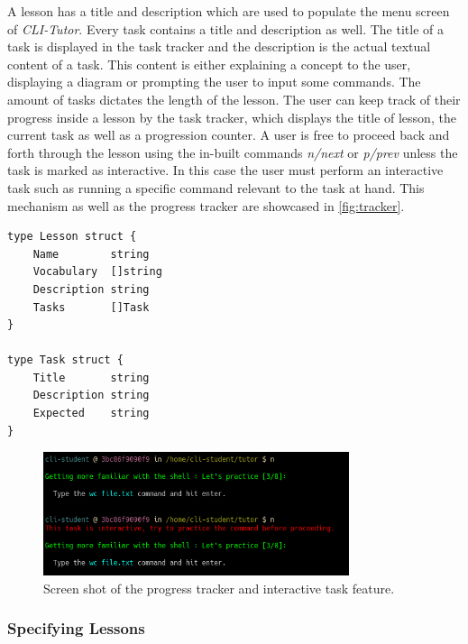 A lesson has a title and description which are used to populate the menu screen
of \textit{CLI-Tutor}. Every task contains a title and description as well. The
title of a task is displayed in the task tracker and the description is the
actual textual content of a task. This content is either explaining a concept
to the user, displaying a diagram or prompting the user to input some commands.
The amount of tasks dictates the length of the lesson. The user can keep track
of their progress inside a lesson by the task tracker, which displays the title
of lesson, the current task as well as a progression counter. A user is free to
proceed back and forth through the lesson using the in-built commands
\textit{n/next} or \textit{p/prev} unless the task is marked as interactive. In
this case the user must perform an interactive task such as running a specific
command relevant to the task at hand. This mechanism as well as the progress
tracker are showcased in \autoref{fig:tracker}.

\vspace{1em}
\begin{lstlisting}[label=lst:types, frame=single, caption=Data structures for a Lesson and a Task within a Lesson.]
type Lesson struct {
	Name        string
	Vocabulary  []string
	Description string
	Tasks       []Task
}

type Task struct {
	Title       string
	Description string
	Expected    string
}
\end{lstlisting}

\begin{figure}[htbp]
	\centering
	\includegraphics[width=0.8\textwidth]{img/tracker}
	\caption{Screen shot of the progress tracker and interactive task feature.}
	\label{fig:tracker}
\end{figure}
\clearpage

\subsubsection{Specifying Lessons}

